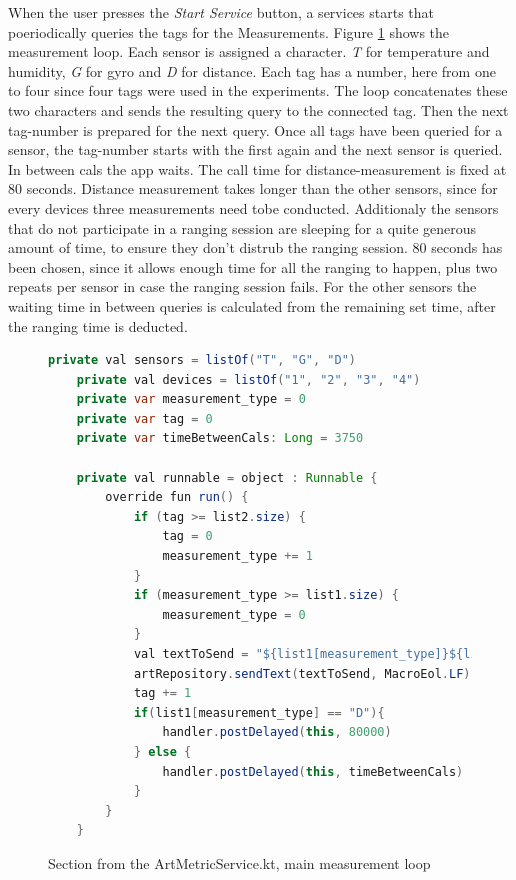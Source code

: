 When the user presses the \textit{Start Service} button, a services starts that poeriodically queries the tags for the Measurements.
Figure \ref{code:App_main_loop} shows the measurement loop.
Each sensor is assigned a character.
\textit{T} for temperature and humidity, \textit{G} for gyro and \textit{D} for distance.
Each tag has a number, here from one to four since four tags were used in the experiments.
The loop concatenates these two characters and sends the resulting query to the connected tag.
Then the next tag-number is prepared for the next query.
Once all tags have been queried for a sensor, the tag-number starts with the first again and the next sensor is queried.
In between cals the app waits.
The call time for distance-measurement is fixed at 80 seconds.
Distance measurement takes longer than the other sensors, since for every devices three measurements need tobe conducted.
Additionaly the sensors that do not participate in a ranging session are sleeping for a quite generous amount of time, to ensure they don't distrub the ranging session.
80 seconds has been chosen, since it allows enough time for all the ranging to happen, plus two repeats per sensor in case the ranging session fails.
For the other sensors the waiting time in between queries is calculated from the remaining set time, after the ranging time is deducted.

\begin{figure}[h]
    \centering
    \begin{lstlisting}[language=Java]
    private val sensors = listOf("T", "G", "D")
    private val devices = listOf("1", "2", "3", "4")
    private var measurement_type = 0
    private var tag = 0
    private var timeBetweenCals: Long = 3750

    private val runnable = object : Runnable {
        override fun run() {
            if (tag >= list2.size) {
                tag = 0
                measurement_type += 1
            }
            if (measurement_type >= list1.size) {
                measurement_type = 0
            }
            val textToSend = "${list1[measurement_type]}${list2[tag]}"
            artRepository.sendText(textToSend, MacroEol.LF)
            tag += 1
            if(list1[measurement_type] == "D"){
                handler.postDelayed(this, 80000)
            } else {
                handler.postDelayed(this, timeBetweenCals)
            }
        }
    }
    \end{lstlisting}
    \caption{Section from the ArtMetricService.kt, main measurement loop}
	\label{code:App_main_loop}
\end{figure}

